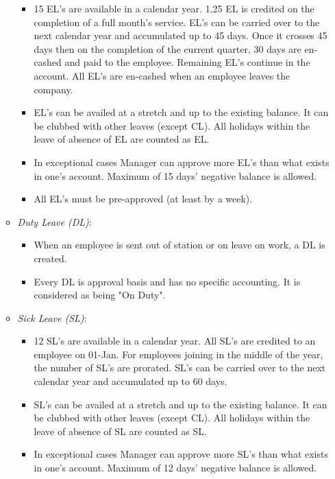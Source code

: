 \documentclass{article}
\begin{document}
\begin{footnotesize}
\begin{enumerate}
\begin{itemize}
\begin{itemize}
\item 15 EL's are available in a calendar year. 1.25 EL is credited on the completion of a full month's service. EL's can be carried over to the next calendar year and accumulated up to 45 days. Once it crosses 45 days then on the completion of the current quarter, 30 days are en-cashed and paid to the employee. Remaining EL's continue in the account. All EL's are en-cashed when an employee leaves the company.

\item EL's can be availed at a stretch and up to the existing balance. It can be clubbed with other leaves (except CL). All holidays within the leave of absence of EL are counted as EL.

\item In exceptional cases Manager can approve more EL's than what exists in one's account. Maximum of 15 days' negative balance is allowed.

\item All EL's must be pre-approved (at least by a week).

\end{itemize}

\item {\em Duty Leave (DL)}: 
\begin{itemize}
\item When an employee is sent out of station or on leave on work, a DL is created. 
\item Every DL is approval basis and has no specific accounting. It is considered as being "On Duty".
\end{itemize}

\item {\em Sick Leave (SL)}: 
\begin{itemize}

\item 12 SL's are available in a calendar year. All SL's are credited to an employee on 01-Jan. For employees joining in the middle of the year, the number of SL's are prorated. SL's can be carried over to the next calendar year and accumulated up to 60 days.

\item SL's can be availed at a stretch and up to the existing balance. It can be clubbed with other leaves (except CL). All holidays within the leave of absence of SL are counted as SL.

\item In exceptional cases Manager can approve more SL's than what exists in one's account. Maximum of 12 days' negative balance is allowed.


\end{itemize}
\end{itemize}
\end{enumerate}
\end{footnotesize}
\end{document}
